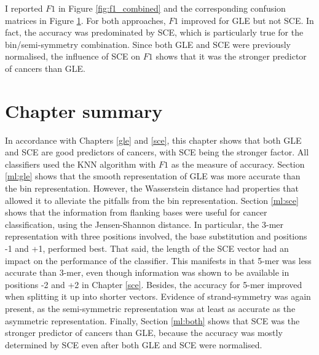 I reported $F1$ in Figure \ref{fig:f1_combined} and the corresponding confusion matrices in Figure \ref{}. For both approaches, $F1$ improved for GLE but not SCE. In fact, the accuracy was predominated by SCE, which is particularly true for the bin/semi-symmetry combination. Since both GLE and SCE were previously normalised, the influence of SCE on $F1$ shows that it was the stronger predictor of cancers than GLE.



\section{Chapter summary}
In accordance with Chapters \ref{gle} and \ref{sce}, this chapter shows that both GLE and SCE are good predictors of cancers, with SCE being the stronger factor. All classifiers used the KNN algorithm with $F1$ as the measure of accuracy. Section \ref{ml:gle} shows that the smooth representation of GLE was more accurate than the bin representation. However, the Wasserstein distance had properties that allowed it to alleviate the pitfalls from the bin representation. Section \ref{ml:sce} shows that the information from flanking bases were useful for cancer classification, using the Jensen-Shannon distance. In particular, the 3-mer representation with three positions involved, the base substitution and positions -1 and +1, performed best. That said, the length of the SCE vector had an impact on the performance of the classifier. This manifests in that 5-mer was less accurate than 3-mer, even though information was shown to be available in positions -2 and +2 in Chapter \ref{sce}. Besides, the accuracy for 5-mer improved when splitting it up into shorter vectors. Evidence of strand-symmetry was again present, as the semi-symmetric representation was at least as accurate as the asymmetric representation. Finally, Section \ref{ml:both} shows that SCE was the stronger predictor of cancers than GLE, because the accuracy was mostly determined by SCE even after both GLE and SCE were normalised.
